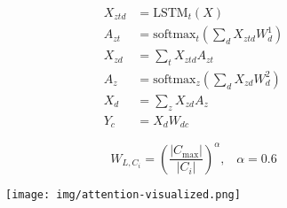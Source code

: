 \documentclass[runningheads,a4paper,12pt]{uwsese}
\begin{document}
\begin{align}
X_{ztd} &= \text{LSTM}_t(X) \\
A_{zt} &= \text{softmax}_t\left(\sum_d X_{ztd} W_{d}^1\right) \\
X_{zd} &= \sum_t X_{ztd} A_{zt} \\
A_{z} &= \text{softmax}_z\left(\sum_d X_{zd} W_{d}^2\right) \\
X_{d} &= \sum_z X_{zd} A_z \\
Y_c &= X_d W_{dc}
\end{align}


\begin{equation}
W_{L,C_i} = \left(\frac{|C_{\max}|}{|C_i|}\right)^\alpha,\;\;\;\alpha = 0.6
\end{equation}


\begin{figure}[h!]
\centering
\texttt{[image: img/attention-visualized.png]}
\end{figure}
\end{document}
